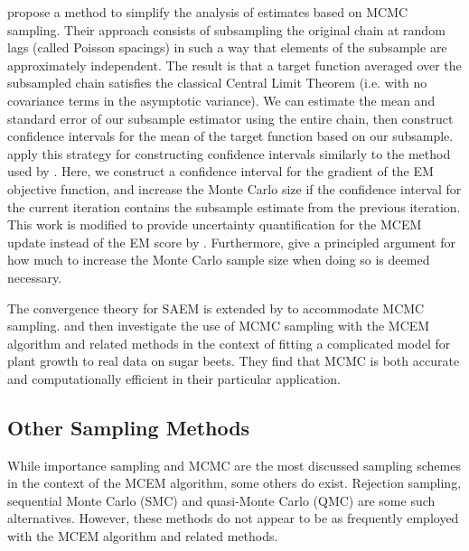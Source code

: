 \documentclass[ss]{imsart}
\theoremstyle{plain}
\theoremstyle{definition}
\theoremstyle{remark}
\begin{document}
\citet{Lev01} propose a method to simplify the analysis of estimates based on MCMC sampling. Their approach consists of subsampling the original chain at random lags (called Poisson spacings) in such a way that elements of the subsample are approximately independent. The result is that a target function averaged over the subsampled chain satisfies the classical Central Limit Theorem (i.e. with no covariance terms in the asymptotic variance). We can estimate the mean and standard error of our subsample estimator using the entire chain, then construct confidence intervals for the mean of the target function based on our subsample. \citeauthor{Lev01} apply this strategy for constructing confidence intervals similarly to the method used by \citet{Boo99}. Here, we construct a confidence interval for the gradient of the EM objective function, and increase the Monte Carlo size if the confidence interval for the current iteration contains the subsample estimate from the previous iteration. This work is modified to provide uncertainty quantification for the MCEM update instead of the EM score by \citet{Lev04}. Furthermore, \citeauthor{Lev04} give a principled argument for how much to increase the Monte Carlo sample size when doing so is deemed necessary.

The convergence theory for SAEM is extended by \citet{Kuh04} to accommodate MCMC sampling. \citet{Tre14} and \citet{Bae16} then investigate the use of MCMC sampling with the MCEM algorithm and related methods in the context of fitting a complicated model for plant growth to real data on sugar beets. They find that MCMC is both accurate and computationally efficient in their particular application.


\subsection{Other Sampling Methods} \label{sec:other_samplers}

While importance sampling and MCMC are the most discussed sampling schemes in the context of the MCEM algorithm, some others do exist. Rejection sampling, sequential Monte Carlo (SMC) and quasi-Monte Carlo (QMC) are some such alternatives. However, these methods do not appear to be as frequently employed with the MCEM algorithm and related methods.
\end{document}
